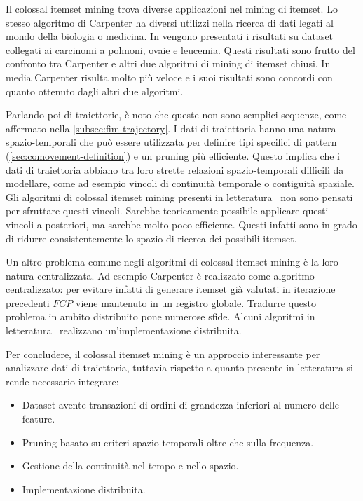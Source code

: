 Il colossal itemset mining trova diverse applicazioni nel mining di itemset.
Lo stesso algoritmo di Carpenter ha diversi utilizzi nella ricerca di dati legati al mondo della biologia o medicina.
In \cite{pan2003carpenter} vengono presentati i risultati su dataset collegati ai carcinomi a polmoni, ovaie e leucemia.
Questi risultati sono frutto del confronto tra Carpenter e altri due algoritmi di mining di itemset chiusi.
In media Carpenter risulta molto più veloce e i suoi risultati sono concordi con quanto ottenuto dagli altri due algoritmi.

Parlando poi di traiettorie, è noto che queste non sono semplici sequenze, come affermato nella \cref{subsec:fim-trajectory}.
I dati di traiettoria hanno una natura spazio-temporali che può essere utilizzata per definire tipi specifici di pattern (\cref{sec:comovement-definition}) e un pruning più efficiente.
Questo implica che i dati di traiettoria abbiano tra loro strette relazioni spazio-temporali difficili da modellare, come ad esempio vincoli di continuità temporale o contiguità spaziale.
Gli algoritmi di colossal itemset mining presenti in letteratura~\cite{DBLP:journals/bdr/ApilettiBCGPM17, DBLP:conf/kdd/PanCTYZ03} non sono pensati per sfruttare questi vincoli.
Sarebbe teoricamente possibile applicare questi vincoli a posteriori, ma sarebbe molto poco efficiente.
Questi infatti sono in grado di ridurre consistentemente lo spazio di ricerca dei possibili itemset.

Un altro problema comune negli algoritmi di colossal itemset mining è la loro natura centralizzata. 
Ad esempio Carpenter è realizzato come algoritmo centralizzato: per evitare infatti
di generare itemset già valutati in iterazione precedenti \(FCP\) viene mantenuto in un registro globale.
Tradurre questo problema in ambito distribuito pone numerose sfide.
Alcuni algoritmi in letteratura~\cite{DBLP:journals/bdr/ApilettiBCGPM17, vanahalli2019efficient} realizzano un'implementazione distribuita.

Per concludere, il colossal itemset mining è un approccio interessante per analizzare dati di traiettoria, tuttavia 
rispetto a quanto presente in letteratura si rende necessario integrare:

\begin{itemize}
    \item Dataset avente transazioni di ordini di grandezza inferiori al numero delle feature.
    \item Pruning basato su criteri spazio-temporali oltre che sulla frequenza.
    \item Gestione della continuità nel tempo e nello spazio.
    \item Implementazione distribuita.
\end{itemize}